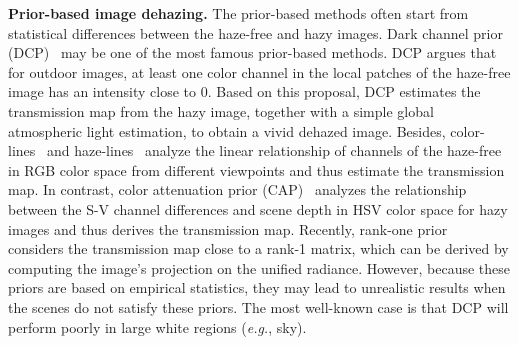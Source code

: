 \documentclass[10pt,twocolumn,letterpaper]{article}
\begin{document}
\noindent\textbf{Prior-based image dehazing.}
The prior-based methods often start from statistical differences between the haze-free and hazy images.
Dark channel prior (DCP)~\cite{he2010single} may be one of the most famous prior-based methods.
DCP argues that for outdoor images, at least one color channel in the local patches of the haze-free image has an intensity close to 0. 
Based on this proposal, DCP estimates the transmission map from the hazy image, together with a simple global atmospheric light estimation, to obtain a vivid dehazed image.
Besides, color-lines~\cite{fattal2014dehazing} and haze-lines~\cite{berman2016non} analyze the linear relationship of channels of the haze-free in RGB color space from different viewpoints and thus estimate the transmission map.
In contrast, color attenuation prior (CAP)~\cite{zhu2015fast} analyzes the relationship between the S-V channel differences and scene depth in HSV color space for hazy images and thus derives the transmission map.
Recently, rank-one prior~\cite{liu2021rank} considers the transmission map close to a rank-1 matrix, which can be derived by computing the image's projection on the unified radiance.
However, because these priors are based on empirical statistics, they may lead to unrealistic results when the scenes do not satisfy these priors.
The most well-known case is that DCP will perform poorly in large white regions (\emph{e.g.}, sky).
\end{document}
